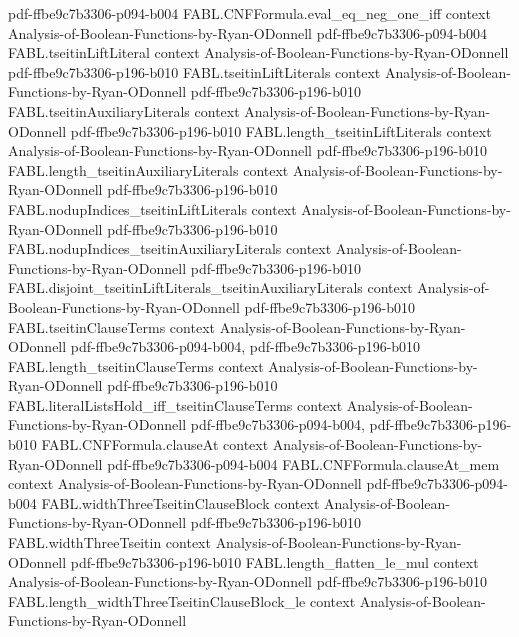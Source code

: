 \begin{theorem}
  {pdf-ffbe9c7b3306-p094-b004}
\proofstep
  {FABL.CNFFormula.eval_eq_neg_one_iff}
  {context}
  {Analysis-of-Boolean-Functions-by-Ryan-ODonnell}
  {pdf-ffbe9c7b3306-p094-b004}
\proofstep
  {FABL.tseitinLiftLiteral}
  {context}
  {Analysis-of-Boolean-Functions-by-Ryan-ODonnell}
  {pdf-ffbe9c7b3306-p196-b010}
\proofstep
  {FABL.tseitinLiftLiterals}
  {context}
  {Analysis-of-Boolean-Functions-by-Ryan-ODonnell}
  {pdf-ffbe9c7b3306-p196-b010}
\proofstep
  {FABL.tseitinAuxiliaryLiterals}
  {context}
  {Analysis-of-Boolean-Functions-by-Ryan-ODonnell}
  {pdf-ffbe9c7b3306-p196-b010}
\proofstep
  {FABL.length_tseitinLiftLiterals}
  {context}
  {Analysis-of-Boolean-Functions-by-Ryan-ODonnell}
  {pdf-ffbe9c7b3306-p196-b010}
\proofstep
  {FABL.length_tseitinAuxiliaryLiterals}
  {context}
  {Analysis-of-Boolean-Functions-by-Ryan-ODonnell}
  {pdf-ffbe9c7b3306-p196-b010}
\proofstep
  {FABL.nodupIndices_tseitinLiftLiterals}
  {context}
  {Analysis-of-Boolean-Functions-by-Ryan-ODonnell}
  {pdf-ffbe9c7b3306-p196-b010}
\proofstep
  {FABL.nodupIndices_tseitinAuxiliaryLiterals}
  {context}
  {Analysis-of-Boolean-Functions-by-Ryan-ODonnell}
  {pdf-ffbe9c7b3306-p196-b010}
\proofstep
  {FABL.disjoint_tseitinLiftLiterals_tseitinAuxiliaryLiterals}
  {context}
  {Analysis-of-Boolean-Functions-by-Ryan-ODonnell}
  {pdf-ffbe9c7b3306-p196-b010}
\proofstep
  {FABL.tseitinClauseTerms}
  {context}
  {Analysis-of-Boolean-Functions-by-Ryan-ODonnell}
  {pdf-ffbe9c7b3306-p094-b004,
    pdf-ffbe9c7b3306-p196-b010}
\proofstep
  {FABL.length_tseitinClauseTerms}
  {context}
  {Analysis-of-Boolean-Functions-by-Ryan-ODonnell}
  {pdf-ffbe9c7b3306-p196-b010}
\proofstep
  {FABL.literalListsHold_iff_tseitinClauseTerms}
  {context}
  {Analysis-of-Boolean-Functions-by-Ryan-ODonnell}
  {pdf-ffbe9c7b3306-p094-b004,
    pdf-ffbe9c7b3306-p196-b010}
\proofstep
  {FABL.CNFFormula.clauseAt}
  {context}
  {Analysis-of-Boolean-Functions-by-Ryan-ODonnell}
  {pdf-ffbe9c7b3306-p094-b004}
\proofstep
  {FABL.CNFFormula.clauseAt_mem}
  {context}
  {Analysis-of-Boolean-Functions-by-Ryan-ODonnell}
  {pdf-ffbe9c7b3306-p094-b004}
\proofstep
  {FABL.widthThreeTseitinClauseBlock}
  {context}
  {Analysis-of-Boolean-Functions-by-Ryan-ODonnell}
  {pdf-ffbe9c7b3306-p196-b010}
\proofstep
  {FABL.widthThreeTseitin}
  {context}
  {Analysis-of-Boolean-Functions-by-Ryan-ODonnell}
  {pdf-ffbe9c7b3306-p196-b010}
\proofstep
  {FABL.length_flatten_le_mul}
  {context}
  {Analysis-of-Boolean-Functions-by-Ryan-ODonnell}
  {pdf-ffbe9c7b3306-p196-b010}
\proofstep
  {FABL.length_widthThreeTseitinClauseBlock_le}
  {context}
  {Analysis-of-Boolean-Functions-by-Ryan-ODonnell}

\end{theorem}
